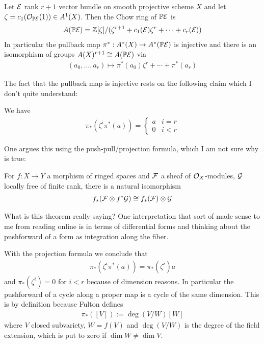 \documentclass[12pt]{article}
\begin{document}
\begin{theorem}
	Let ${\mathcal{E}}$ rank $r+1$ vector bundle on smooth projective scheme $X$ and let
	$\zeta = c_1({\mathcal{O}}_{\mathbb{P}{\mathcal{E}}}(1)) \in A^1(X)$. Then the Chow ring of $\mathbb{P}{\mathcal{E}}$ is
	\begin{align*}
		A(\mathbb{P}{\mathcal{E}}) = \mathbb{Z}[\zeta]/(\zeta^{r+1} + c_1({\mathcal{E}})\zeta^r + \cdots + c_r({\mathcal{E}}))
	\end{align*}
	In particular the pullback map $\pi^*: A^*(X) \to A^*(\mathbb{P}{\mathcal{E}})$ is injective and
	there is an isomorphism of groups $A(X)^{r+1} \cong A(\mathbb{P}{\mathcal{E}})$ via \begin{align*}
		(a_0,\ldots,a_r) \mapsto \pi^*(a_0)\zeta^r + \cdots + \pi^*(a_r)
	\end{align*}
\end{theorem}

The fact that the pullback map is injective rests on the following claim which I don't
quite understand:

\begin{lemma}
	We have \begin{align*}
		\pi_*(\zeta^i\pi^*(a)) = \begin{cases}
			                         a & i = r \\
			                         0 & i < r
		                         \end{cases}
	\end{align*}
\end{lemma}

One argues this using the push-pull/projection formula, which I am not sure
why is true:

\begin{theorem}
	For $f:X\to Y$ a morphism of ringed spaces and ${\mathcal{F}}$ a sheaf of ${\mathcal{O}}_X$-modules,
	${\mathcal{G}}$ locally free of finite rank, there is a natural isomorphism \begin{align*}
		f_*({\mathcal{F}}\otimes f^*{\mathcal{G}}) \cong f_*({\mathcal{F}})\otimes {\mathcal{G}}
	\end{align*}
\end{theorem}

\begin{remark}
	What is this theorem really saying?
	One interpretation that sort of made sense to me from reading online is
	in terms of differential forms and thinking about the pushforward of a form as
	integration along the fiber.
\end{remark}

With the projection formula we conclude that \begin{align*}
	\pi_*(\zeta^i\pi^*(a)) = \pi_*(\zeta^i)a
\end{align*} and $\pi_*(\zeta^i) = 0$ for $i < r$ because of dimension reasons.
In particular the pushforward of a cycle along a proper map is a cycle
of the same dimension. This is by definition because Fulton defines \begin{align*}
	\pi_*([V]) := \deg(V/W)[W]
\end{align*} where $V$ closed subvariety, $W = f(V)$ and $\deg(V/W)$ is the degree of the
field extension, which is put to zero if $\dim W \neq \dim V$.
\end{document}
